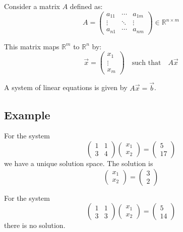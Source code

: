\documentclass[11pt]{article}
\begin{document}
Consider a matrix \( A \) defined as:
\[ A = \begin{pmatrix}
    a_{11} & \cdots & a_{1m} \\
    \vdots & \ddots & \vdots \\
    a_{n1} & \cdots & a_{nm}
\end{pmatrix} \in \mathbb{R}^{n \times m} \]

This matrix maps \( \mathbb{R}^m \) to \( \mathbb{R}^n \) by:
\[ \vec{x} = \begin{pmatrix}
    x_1 \\
    \vdots \\
    x_m
\end{pmatrix} \quad \text{such that} \quad A\vec{x} \]

A system of linear equations is given by \( A\vec{x} = \vec{b} \).

\subsection*{Example}
For the system
\[ \begin{pmatrix}
    1 & 1 \\
    3 & 4
\end{pmatrix} \begin{pmatrix}
    x_1 \\
    x_2
\end{pmatrix} = \begin{pmatrix}
    5 \\
    17
\end{pmatrix} \]
we have a unique solution space. The solution is
\[ \begin{pmatrix}
    x_1 \\
    x_2
\end{pmatrix} = \begin{pmatrix}
    3 \\
    2
\end{pmatrix} \]

For the system
\[ \begin{pmatrix}
    1 & 1 \\
    3 & 3
\end{pmatrix} \begin{pmatrix}
    x_1 \\
    x_2
\end{pmatrix} = \begin{pmatrix}
    5 \\
    14
\end{pmatrix} \]
there is no solution.
\end{document}
